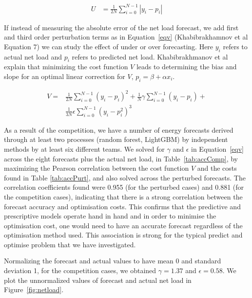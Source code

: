 \documentclass[conference]{IEEEtran}
\begin{document}
\begin{equation}
\begin{aligned}
    U & = \frac{1}{2N} \sum_{i=0}^{N-1}{|y_i-p_i|}
\end{aligned}
\label{equ}
\end{equation}

If instead of measuring the absolute error of the net load forecast, we add first and third order perturbation terms as in Equation~\ref{eqv} (Khabibrakhamnov et al Equation 7) we can study the effect of under or over forecasting. Here $y_i$ refers to actual net load and $p_i$ refers to predicted net load. Khabibrakhmanov et al explain that minimizing the cost function $V$ leads to determining the bias and slope for an optimal linear correction for $V$, $p_i = \beta + \alpha x_i$.

\begin{equation}
\begin{aligned}
    V  = & \frac{1}{2N} \sum_{i=0}^{N-1}{(y_i-p_i)^2}+\frac{1}{N}\gamma\sum_{i=0}^{N-1}{(y_i-p_i)}+ \\
    & \frac{1}{3N}\epsilon\sum_{i=0}^{N-1}{(y_i-p_i^2)^3}
    \end{aligned}
    \label{eqv}
\end{equation}

As a result of the competition, we have a number of energy forecasts derived through at least two processes (random forest, LightGBM) by independent methods by at least six different teams. We solved for $\gamma$ and $\epsilon$ in Equation~\ref{eqv} across the eight forecasts plus the actual net load, in Table~\ref{tab:accComp}, by maximizing the Pearson correlation between the cost function $V$ and the costs found in Table \ref{tab:accPurt}, and also solved across the perturbed forecasts. The correlation coefficients found were 0.955 (for the perturbed cases) and 0.881 (for the competition cases), indicating that there is a strong correlation between the forecast accuracy and optimisation costs. This confirms that the predictive and prescriptive models operate hand in hand and in order to minimise the optimisation cost, one would need to have an accurate forecast regardless of the optimisation method used. This association is strong for the typical predict and optimise problem that we have investigated. 

Normalizing the forecast and actual values to have mean 0 and standard deviation 1, for the competition cases, we obtained $\gamma = 1.37$ and $\epsilon = 0.58$. We plot the unnormalized values of forecast and actual net load in Figure~\ref{fig:netload}. 
\end{document}
